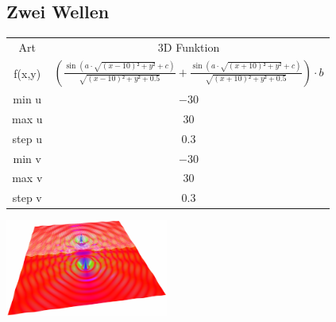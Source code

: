 \documentclass{scrartcl}
\begin{document}
\subsection{Zwei Wellen}
\begin{tabular}[b]{|c|c|}\hline
\rowcolor[gray]{0.5}
Art & 3D Funktion \\
\rowcolor[gray]{1}
f(x,y) & \(\left (\frac{\sin\left(a \cdot \sqrt{(x-10)²+y²}+c\right)}{\sqrt{(x-10)²+y²+0.5}}+\frac{\sin\left(a \cdot \sqrt{(x+10)²+y²}+c\right)}{\sqrt{(x+10)²+y²+0.5}}\right )\cdot b\)\\
\rowcolor[gray]{0.5}
min u & \(-30\) \\
\rowcolor[gray]{1}
max u & \(30\) \\
\rowcolor[gray]{0.5}
step u & \(0.3\) \\
\rowcolor[gray]{1}
min v & \(-30\) \\
\rowcolor[gray]{0.5}
max v & \(30\) \\
\rowcolor[gray]{1}
step v &\(0.3\) \\\hline
\end{tabular}
\includegraphics[width=0.4\textwidth]{images/graphs/two_waves.png}
\end{document}

